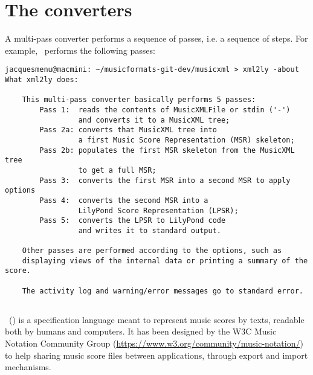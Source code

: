 
\chapter{The converters}

A multi-pass converter performs a sequence of passes, i.e. a sequence of steps. For example, \xmlToLy\ performs the following passes:
\begin{lstlisting}[language=Terminal]
jacquesmenu@macmini: ~/musicformats-git-dev/musicxml > xml2ly -about
What xml2ly does:

    This multi-pass converter basically performs 5 passes:
        Pass 1:  reads the contents of MusicXMLFile or stdin ('-')
                 and converts it to a MusicXML tree;
        Pass 2a: converts that MusicXML tree into
                 a first Music Score Representation (MSR) skeleton;
        Pass 2b: populates the first MSR skeleton from the MusicXML tree
                 to get a full MSR;
        Pass 3:  converts the first MSR into a second MSR to apply options
        Pass 4:  converts the second MSR into a
                 LilyPond Score Representation (LPSR);
        Pass 5:  converts the LPSR to LilyPond code
                 and writes it to standard output.

    Other passes are performed according to the options, such as
    displaying views of the internal data or printing a summary of the score.

    The activity log and warning/error messages go to standard error.
\end{lstlisting}


\section{\xmlToLy}

\mxml\ () is a specification language meant to represent music scores by texts, readable both by humans and computers. It has been designed by the W3C Music Notation Community Group (\url{https://www.w3.org/community/music-notation/}) to help sharing music score files between applications, through export and import mechanisms.


